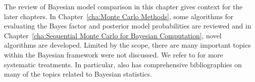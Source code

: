 The review of Bayesian model comparison in this chapter gives context for the
later chapters. In Chapter~\ref{cha:Monte Carlo Methods}, some algorithms for
evaluating the Bayes factor and posterior model probabilities are reviewed and
in Chapter~\ref{cha:Sequential Monte Carlo for Bayesian Computation}, novel
algorithms are developed. Limited by the scope, there are many important
topics within the Bayesian framework were not discussed. We refer to
\cite{Bernardo:1994vd,Robert:2007tc} for more systematic treatments. In
particular, \cite{Bernardo:1994vd} also has comprehensive bibliographies on
many of the topics related to Bayesian statistics.
